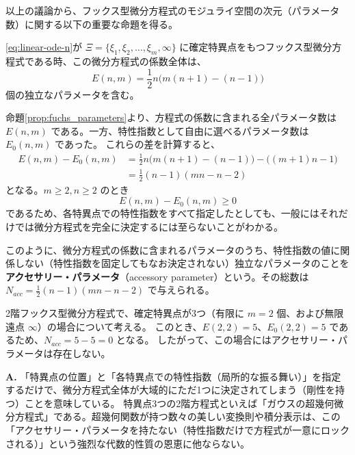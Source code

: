 以上の議論から、フックス型微分方程式のモジュライ空間の次元（パラメータ数）に関する以下の重要な命題を得る。

\begin{proposition}\label{prop:fuchs_parameters}
\eqref{eq:linear-ode-n}が $\Xi=\{\xi_{1}, \xi_{2}, \dots, \xi_{m}, \infty\}$ に確定特異点をもつフックス型微分方程式である時、この微分方程式の係数全体は、
\[
E(n,m) = \frac{1}{2}n \big( m(n+1) - (n-1) \big)
\]
個の独立なパラメータを含む。
\end{proposition}

命題\ref{prop:fuchs_parameters}より、方程式の係数に含まれる全パラメータ数は $E(n,m)$ である。一方、特性指数として自由に選べるパラメータ数は $E_{0}(n,m)$ であった。
これらの差を計算すると、
\begin{align*}
E(n,m) - E_{0}(n,m) &= \frac{1}{2}n \big( m(n+1) - (n-1) \big) - \big( (m+1)n - 1 \big) \\
&= \frac{1}{2}(n-1)(mn - n - 2)
\end{align*}
となる。$m \ge 2, n \ge 2$ のとき
\[
E(n,m) - E_{0}(n,m) \ge 0
\]
であるため、各特異点での特性指数をすべて指定したとしても、一般にはそれだけでは微分方程式を完全に決定するには至らないことがわかる。

\begin{definition}
このように、微分方程式の係数に含まれるパラメータのうち、特性指数の値に関係しない（特性指数を固定してもなお決定されない）独立なパラメータのことを\textbf{アクセサリー・パラメータ}（accessory parameter）という。その総数は $N_{acc} = \frac{1}{2}(n-1)(mn - n - 2)$ で与えられる。
\end{definition}

\begin{example}\label{ex:acc_parameter_zero}
2階フックス型微分方程式で、確定特異点が3つ（有限に $m=2$ 個、および無限遠点 $\infty$）の場合について考える。
このとき、$E(2,2) = 5$、$E_{0}(2,2) = 5$ であるため、$N_{acc} = 5 - 5 = 0$ となる。
したがって、この場合にはアクセサリー・パラメータは存在しない。
\end{example}

\begin{Q}[【核心】特異点が3つの場合（$m=2$）にアクセサリー・パラメータが $0$ になることは、解析学的に何を意味しているのか？]
\textbf{A.} 「特異点の位置」と「各特異点での特性指数（局所的な振る舞い）」を指定するだけで、微分方程式全体が大域的にただ1つに決定されてしまう（剛性を持つ）ことを意味している。
特異点3つの2階方程式といえば「ガウスの超幾何微分方程式」である。超幾何関数が持つ数々の美しい変換則や積分表示は、この「アクセサリー・パラメータを持たない（特性指数だけで方程式が一意にロックされる）」という強烈な代数的性質の恩恵に他ならない。
\end{Q}

